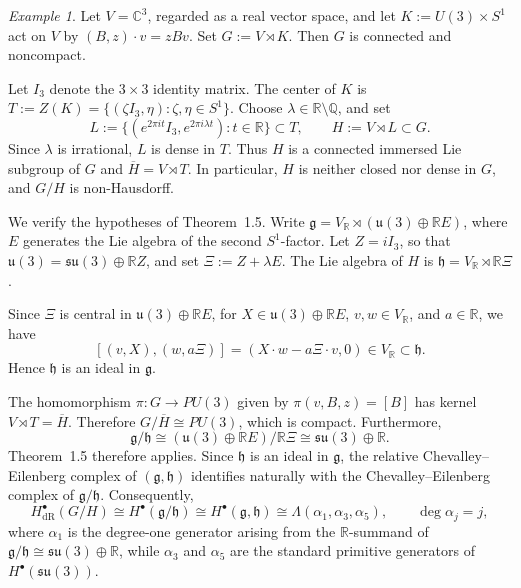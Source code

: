 \documentclass[reqno, 11pt]{amsart}
\theoremstyle{definition}
\theoremstyle{property}
\theoremstyle{remark}
\newtheorem{ex}[thm]{Example}
\numberwithin{equation}{section}
\begin{document}
\begin{ex}
Let $V=\mathbb C^3$, regarded as a real vector space, and let
$K:=U(3)\times S^1$ act on $V$ by $(B,z)\cdot v=zBv$. Set
$G:=V\rtimes K$. Then $G$ is connected and noncompact.

Let $I_3$ denote the $3\times3$ identity matrix. The center of $K$ is
$T:=Z(K)=\{(\zeta I_3,\eta):\zeta,\eta\in S^1\}$. Choose
$\lambda\in\mathbb R\setminus\mathbb Q$, and set
\[
L:=\{(e^{2\pi it}I_3,e^{2\pi i\lambda t}):t\in\mathbb R\}\subset T,
\qquad H:=V\rtimes L\subset G.
\]
Since $\lambda$ is irrational, $L$ is dense in $T$. Thus $H$ is a
connected immersed Lie subgroup of $G$ and
$\overline H=V\rtimes T$. In particular, $H$ is neither closed nor dense
in $G$, and $G/H$ is non-Hausdorff.

We verify the hypotheses of Theorem~1.5. Write
$\mathfrak g=V_{\mathbb R}\rtimes(\mathfrak u(3)\oplus\mathbb RE)$,
where $E$ generates the Lie algebra of the second $S^1$-factor. Let
$Z=iI_3$, so that
$\mathfrak u(3)=\mathfrak{su}(3)\oplus\mathbb RZ$, and set
$\Xi:=Z+\lambda E$. The Lie algebra of $H$ is
$\mathfrak h=V_{\mathbb R}\rtimes\mathbb R\Xi$.

Since $\Xi$ is central in $\mathfrak u(3)\oplus\mathbb RE$, for
$X\in\mathfrak u(3)\oplus\mathbb RE$, $v,w\in V_{\mathbb R}$, and
$a\in\mathbb R$, we have
\[
[(v,X),(w,a\Xi)]
=(X\cdot w-a\Xi\cdot v,0)\in V_{\mathbb R}\subset\mathfrak h.
\]
Hence $\mathfrak h$ is an ideal in $\mathfrak g$.

The homomorphism $\pi:G\to PU(3)$ given by $\pi(v,B,z)=[B]$ has kernel
$V\rtimes T=\overline H$. Therefore $G/\overline H\cong PU(3)$, which
is compact. Furthermore,
\[
\mathfrak g/\mathfrak h
\cong(\mathfrak u(3)\oplus\mathbb RE)/\mathbb R\Xi
\cong\mathfrak{su}(3)\oplus\mathbb R.
\]
Theorem~1.5 therefore applies. Since $\mathfrak h$ is an ideal in
$\mathfrak g$, the relative Chevalley--Eilenberg complex of
$(\mathfrak g,\mathfrak h)$ identifies naturally with the
Chevalley--Eilenberg complex of $\mathfrak g/\mathfrak h$. Consequently,
\[
H^\bullet_{\mathrm{dR}}(G/H)
\cong H^\bullet(\mathfrak g/\mathfrak h)
\cong H^\bullet(\mathfrak g,\mathfrak h)
\cong\Lambda(\alpha_1,\alpha_3,\alpha_5),
\qquad \deg\alpha_j=j,
\]
where $\alpha_1$ is the degree-one generator arising from the
$\mathbb R$-summand of $\mathfrak g/\mathfrak h\cong
\mathfrak{su}(3)\oplus\mathbb R$, while $\alpha_3$ and $\alpha_5$ are
the standard primitive generators of $H^\bullet(\mathfrak{su}(3))$.\end{ex}
\end{document}
